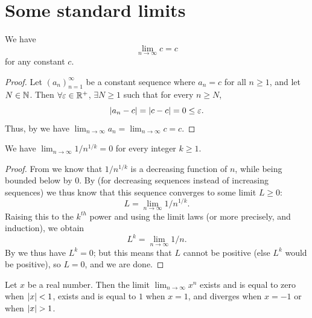 \section{Some standard limits}\label{i:sec:6.5}

\begin{ac}\label{i:ac:6.5.1}
  We have
  \[
    \lim_{n \to \infty} c = c
  \]
  for any constant \(c\).
\end{ac}

\begin{proof}
  Let \((a_n)_{n = 1}^\infty\) be a constant sequence where \(a_n = c\) for all \(n \geq 1\), and let \(N \in \mathbb{N}\).
  Then \(\forall \varepsilon \in \mathbb{R}^+\), \(\exists N \geq 1\) such that for every \(n \geq N\),
  \[
    \left\lvert a_n - c\right\rvert = \left\lvert c - c\right\rvert = 0 \leq \varepsilon.
  \]
  Thus, by  we have \(\lim_{n \to \infty} a_n = \lim_{n \to \infty} c = c\).
\end{proof}

\begin{cor}\label{i:6.5.1}
  We have \(\lim_{n \to \infty} 1 / n^{1 / k} = 0\) for every integer \(k \geq 1\).
\end{cor}

\begin{proof}
  From  we know that \(1 / n^{1 / k}\) is a decreasing function of \(n\), while being bounded below by \(0\).
  By  (for decreasing sequences instead of increasing sequences) we thus know that this sequence converges to some limit \(L \geq 0\):
  \[
    L = \lim_{n \to \infty} 1 / n^{1 / k}.
  \]
  Raising this to the \(k^{th}\) power and using the limit laws (or more precisely,  and induction), we obtain
  \[
    L^k = \lim_{n \to \infty} 1 / n.
  \]
  By  we thus have \(L^k = 0\);
  but this means that \(L\) cannot be positive (else \(L^k\) would be positive), so \(L = 0\), and we are done.
\end{proof}

\begin{lem}\label{i:6.5.2}
  Let \(x\) be a real number.
  Then the limit \(\lim_{n \to \infty} x^n\) exists and is equal to zero when \(\left\lvert x\right\rvert < 1\), exists and is equal to \(1\) when \(x = 1\), and diverges when \(x = -1\) or when \(\left\lvert x\right\rvert > 1\).
\end{lem}

